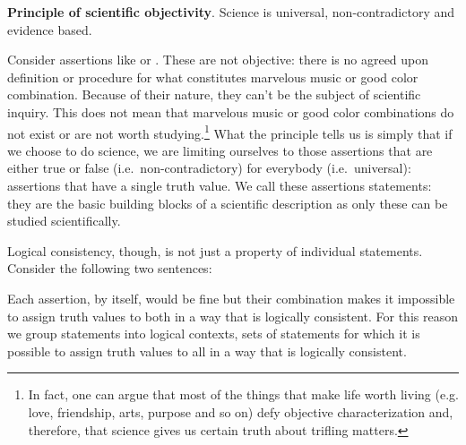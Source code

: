 \documentclass[11pt,letterpaper,fleqn]{memoir} %
\begin{document}
\begin{mathSection}
	\textbf{Principle of scientific objectivity}.
		Science is universal, non-contradictory and evidence based.
\end{mathSection}

Consider assertions like  or . These are not objective: there is no agreed upon definition or procedure for what constitutes marvelous music or good color combination. Because of their nature, they can't be the subject of scientific inquiry. This does not mean that marvelous music or good color combinations do not exist or are not worth studying.\footnote{In fact, one can argue that most of the things that make life worth living (e.g. love, friendship, arts, purpose and so on) defy objective characterization and, therefore, that science gives us certain truth about trifling matters.} What the principle tells us is simply that if we choose to do science, we are limiting ourselves to those assertions that are either true or false (i.e.~non-contradictory) for everybody (i.e.~universal): assertions that have a single truth value. We call these assertions statements: they are the basic building blocks of a scientific description as only these can be studied scientifically.

Logical consistency, though, is not just a property of individual statements. Consider the following two sentences:
\begin{description}
	\item {}
	\item {}
\end{description}
Each assertion, by itself, would be fine but their combination makes it impossible to assign truth values to both in a way that is logically consistent. For this reason we group statements into logical contexts, sets of statements for which it is possible to assign truth values to all in a way that is logically consistent.
\end{document}
